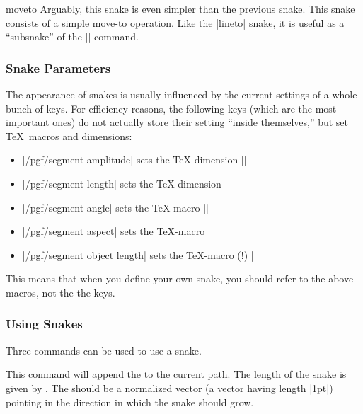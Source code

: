 \begin{snake}{moveto}
  Arguably, this snake is even simpler than the previous snake. This
  snake consists of a simple move-to operation. Like the |lineto|
  snake, it is useful as a ``subsnake'' of the |\pgfsnakesto|
  command. 
\end{snake}


\subsubsection{Snake Parameters}

The appearance of snakes is usually influenced by the current settings
of a whole bunch of keys. For efficiency reasons, the following keys
(which are the most important ones) do not actually store their
setting ``inside themselves,'' but set \TeX\ macros and dimensions:
\begin{itemize}
\item |/pgf/segment amplitude| sets the \TeX-dimension |\pgfsnakesegmentamplitude|
\item |/pgf/segment length| sets the \TeX-dimension |\pgfsnakesegmentlength|
\item |/pgf/segment angle| sets the \TeX-macro |\pgfsnakesegmentangle|
\item |/pgf/segment aspect| sets the \TeX-macro   |\pgfsnakesegmentaspect|
\item |/pgf/segment object length| sets the \TeX-macro (!) |\pgfsnakesegmentobjectlength|
\end{itemize}

This means that when you define your own snake, you should refer to
the above macros, not the the keys.



\subsubsection{Using Snakes}

Three commands can be used to use a snake.

\begin{command}{\pgfpathsnakealongvector{}}
  This command will append the  to the current path. The
  length of the snake is given by . The 
  should be a normalized vector (a vector having length |1pt|)
  pointing in the direction in which the snake should grow.
\begin{codeexample}[]
\end{codeexample}
\end{command}

